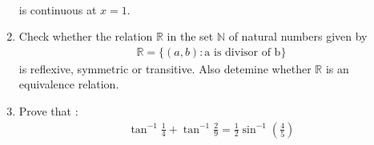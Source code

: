 \documentclass[12pt,-letter paper]{article}
\begin{document}
\begin{enumerate}
\\is continuous at $x=1$.
\item Check whether the relation $\mathbb{R}$ in the set $\mathbb{N}$ of natural numbers given by
\begin{align}
\mathbb{R} = \{(a, b) : \text{a is divisor of b}\}
\end{align}
is reflexive, symmetric or transitive. Also detemine whether $\mathbb{R}$ is an equivalence relation.
\item Prove that :
\begin{align}   \tan^{-1}\frac{1}{4}+\tan^{-1}\frac{2}{9}= \frac{1    }{2}\sin^{-1}\left(\frac{4}{5}\right)
\end{align}                          \end{enumerate}
\end{document}
